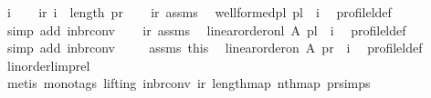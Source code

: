 \begin{isabellebody}
\ i\isanewline
\ \ \isamarkupfalse%
\ ir{\isacharcolon}{\kern0pt}\ {\isachardoublequoteopen}i\ {\isacharless}{\kern0pt}\ length\ pr{\isachardoublequoteclose}\isanewline
\ \ \isamarkupfalse%
\ ir\ assms\ \isamarkupfalse%
\ {\isachardoublequoteopen}well{\isacharunderscore}{\kern0pt}formed{\isacharunderscore}{\kern0pt}pl\ {\isacharparenleft}{\kern0pt}pl\ {\isacharbang}{\kern0pt}\ i{\isacharparenright}{\kern0pt}{\isachardoublequoteclose}\ \isamarkupfalse%
\ profile{\isacharunderscore}{\kern0pt}l{\isacharunderscore}{\kern0pt}def\isanewline
\ \ \ \ \isamarkupfalse%
\ {\isacharparenleft}{\kern0pt}simp\ add{\isacharcolon}{\kern0pt}\ in{\isacharunderscore}{\kern0pt}br{\isacharunderscore}{\kern0pt}conv{\isacharparenright}{\kern0pt}\isanewline
\ \ \isamarkupfalse%
\ ir\ assms\ \isamarkupfalse%
\ {\isachardoublequoteopen}linear{\isacharunderscore}{\kern0pt}order{\isacharunderscore}{\kern0pt}on{\isacharunderscore}{\kern0pt}l\ A\ {\isacharparenleft}{\kern0pt}pl\ {\isacharbang}{\kern0pt}\ i{\isacharparenright}{\kern0pt}{\isachardoublequoteclose}\ \isamarkupfalse%
\ profile{\isacharunderscore}{\kern0pt}l{\isacharunderscore}{\kern0pt}def\isanewline
\ \ \ \ \isamarkupfalse%
\ {\isacharparenleft}{\kern0pt}simp\ add{\isacharcolon}{\kern0pt}\ in{\isacharunderscore}{\kern0pt}br{\isacharunderscore}{\kern0pt}conv{\isacharparenright}{\kern0pt}\ \isanewline
\ \ \isamarkupfalse%
\ assms\ this\ \isamarkupfalse%
\ {\isachardoublequoteopen}linear{\isacharunderscore}{\kern0pt}order{\isacharunderscore}{\kern0pt}on\ A\ {\isacharparenleft}{\kern0pt}pr\ {\isacharbang}{\kern0pt}\ i{\isacharparenright}{\kern0pt}{\isachardoublequoteclose}\ \isamarkupfalse%
\ profile{\isacharunderscore}{\kern0pt}l{\isacharunderscore}{\kern0pt}def\isanewline
\ \ \ \ \isamarkupfalse%
\ linorder{\isacharunderscore}{\kern0pt}l{\isacharunderscore}{\kern0pt}imp{\isacharunderscore}{\kern0pt}rel\isanewline
\ \ \ \ \isamarkupfalse%
\ {\isacharparenleft}{\kern0pt}metis\ {\isacharparenleft}{\kern0pt}mono{\isacharunderscore}{\kern0pt}tags{\isacharcomma}{\kern0pt}\ lifting{\isacharparenright}{\kern0pt}\ in{\isacharunderscore}{\kern0pt}br{\isacharunderscore}{\kern0pt}conv\ ir\ length{\isacharunderscore}{\kern0pt}map\ nth{\isacharunderscore}{\kern0pt}map\ pr{}{\isacharunderscore}{\kern0pt}{\isasymalpha}{\isachardot}{\kern0pt}simps{\isacharparenright}{\kern0pt}\isanewline

\end{isabellebody}

